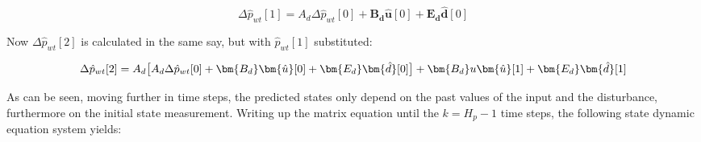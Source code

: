 
\begin{equation}
	\Delta \hat p_{wt}[1] = A_d\Delta \hat p_{wt}[0] + \bm{B_d} \bm{\hat{u}}[0] + \bm{E_d} \bm{\hat{d}}[0]
\end{equation}

Now $\Delta \hat p_{wt}[2]$ is calculated in the same say, but with $\hat p_{wt}[1]$ substituted: 

\begin{equation}
	\Delta \hat p_{wt}[2] = A_d\big[A_d\Delta \hat p_{wt}[0] + \bm{B_d}  \bm{\hat{u}}[0] + \bm{E_d}  \bm{\hat{d}}[0]\big] + \bm{B_d} u\bm{\hat{u}}[1] + \bm{E_d} \bm{\hat{d}}[1]\\ 
\end{equation}

As can be seen, moving further in time steps, the predicted states only depend on the past values of the input and the disturbance, furthermore on the initial state measurement.  Writing up the matrix equation until the $k = H_p - 1$ time steps, the following state dynamic equation system yields:

